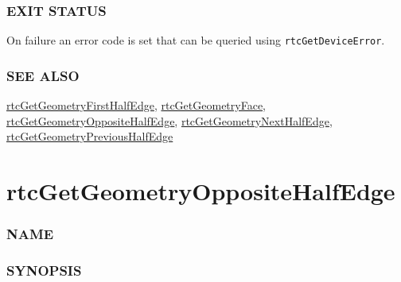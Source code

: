\subsubsection{EXIT STATUS}\label{exit-status}

On failure an error code is set that can be queried using
\texttt{rtcGetDeviceError}.

\subsubsection{SEE ALSO}\label{see-also}

\hyperref[rtcgetgeometryfirsthalfedge]{rtcGetGeometryFirstHalfEdge},
\hyperref[rtcgetgeometryface]{rtcGetGeometryFace},
\hyperref[rtcgetgeometryoppositehalfedge]{rtcGetGeometryOppositeHalfEdge},
\hyperref[rtcgetgeometrynexthalfedge]{rtcGetGeometryNextHalfEdge},
\hyperref[rtcgetgeometryprevioushalfedge]{rtcGetGeometryPreviousHalfEdge}

\pagebreak

\section{rtcGetGeometryOppositeHalfEdge}\label{rtcgetgeometryoppositehalfedge}

\subsubsection{NAME}\label{name}

\begin{Shaded}
\begin{Highlighting}[]
\OperatorTok{{-}}
\end{Highlighting}
\end{Shaded}

\subsubsection{SYNOPSIS}\label{synopsis}

\begin{Shaded}
\begin{Highlighting}[]

 \OperatorTok{(}
\OperatorTok{,}
   \OperatorTok{,}
   
\OperatorTok{);}
\end{Highlighting}
\end{Shaded}

